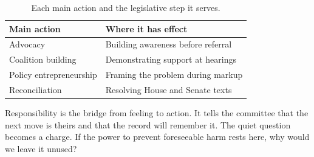 \begin{table}[H]
\footnotesize
\begin{tabularx}{\textwidth}{@{}L{4.0cm} Y@{}}
\toprule
\textbf{Main action} & \textbf{Where it has effect}\\
\midrule
Advocacy & Building awareness before referral\\
Coalition building & Demonstrating support at hearings\\
Policy entrepreneurship & Framing the problem during markup\\
Reconciliation & Resolving House and Senate texts\\
\bottomrule
\end{tabularx}
\caption{Each main action and the legislative step it serves.}
\label{tab:duty}
\end{table}

Responsibility is the bridge from feeling to action. It tells the committee that
the next move is theirs and that the record will remember it. The quiet question
becomes a charge. If the power to prevent foreseeable harm rests here, why would we
leave it unused?
